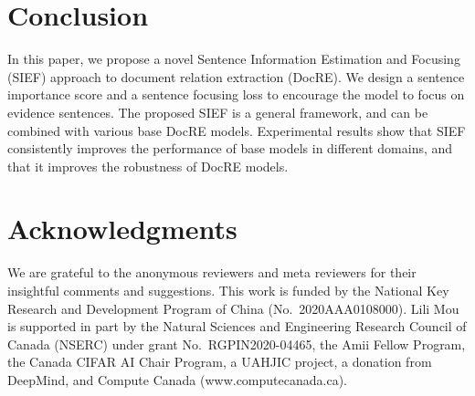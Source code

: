 \documentclass[11pt]{article}
\begin{document}
\section{Conclusion}
\label{sec6}
In this paper, we propose a novel Sentence Information Estimation and Focusing (SIEF) approach to document relation extraction (DocRE). We design a sentence importance score and a sentence focusing loss to encourage the model to focus on evidence sentences. The proposed SIEF is a general framework, and can be combined with various base DocRE models. 
Experimental results show that SIEF consistently improves the performance of base models in different domains, and that it improves the robustness of DocRE models.

\section*{Acknowledgments}
We are grateful to the anonymous reviewers and meta reviewers for their insightful comments and suggestions.
This work is funded by the National Key Research and Development Program of China (No.~2020AAA0108000). Lili Mou is supported in part by the Natural Sciences and Engineering Research Council of Canada (NSERC) under grant
No.~RGPIN2020-04465, the Amii Fellow Program, the Canada CIFAR AI Chair Program, a UAHJIC project, a donation from DeepMind, and Compute Canada (www.computecanada.ca).




\appendix
\clearpage
\end{document}
